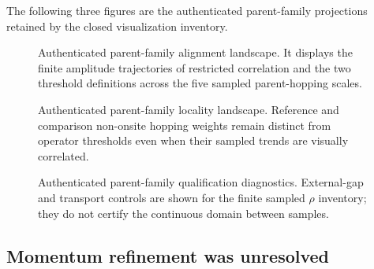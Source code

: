 The following three figures are the authenticated parent-family projections retained by
the closed visualization inventory.

\begin{figure}[htbp]
 \centering
 \caption{Authenticated parent-family alignment landscape.  It displays the finite
 amplitude trajectories of restricted correlation and the two threshold definitions
 across the five sampled parent-hopping scales.}
\end{figure}

\begin{figure}[htbp]
 \centering
 \caption{Authenticated parent-family locality landscape.  Reference and comparison
 non-onsite hopping weights remain distinct from operator thresholds even when their
 sampled trends are visually correlated.}
\end{figure}

\begin{figure}[htbp]
 \centering
 \caption{Authenticated parent-family qualification diagnostics.  External-gap and
 transport controls are shown for the finite sampled $\rho$ inventory; they do not certify
 the continuous domain between samples.}
\end{figure}

\subsection{Momentum refinement was unresolved}

